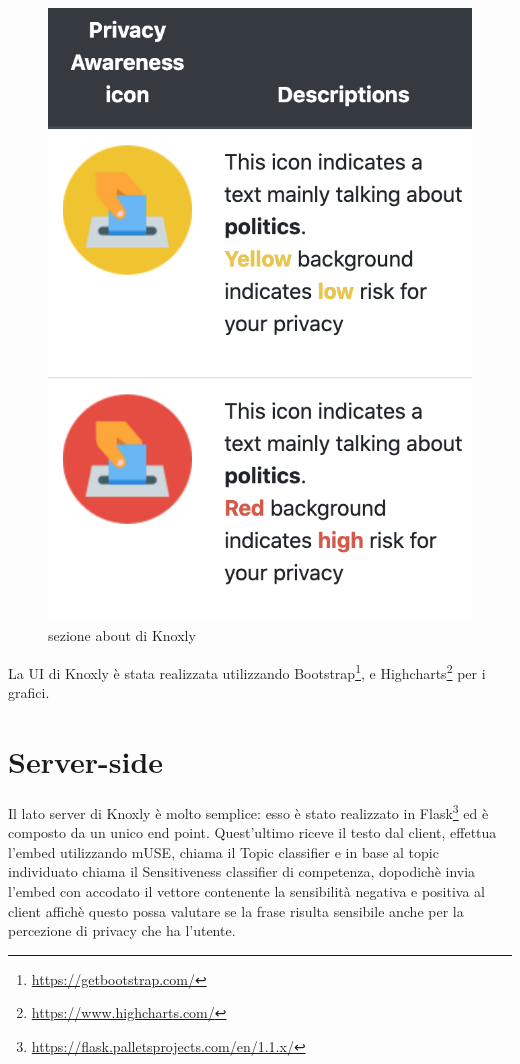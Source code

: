 \begin{figure}[h]
    \centering
    \includegraphics[scale=0.5]{Figure/ui/about-2.png}
    \caption{sezione about di Knoxly}
    \label{fig:about}
\end{figure}
\FloatBarrier

La UI di Knoxly è stata realizzata utilizzando Bootstrap\footnote{\url{https://getbootstrap.com/}}, e Highcharts\footnote{\url{https://www.highcharts.com/}} per i grafici.

\section{Server-side}
\label{sec:backend}
Il lato server di Knoxly è molto semplice: esso è stato realizzato in Flask\footnote{\url{https://flask.palletsprojects.com/en/1.1.x/}} ed è composto da un unico end point. Quest'ultimo riceve il testo dal client, effettua l'embed utilizzando mUSE, chiama il Topic classifier e in base al topic individuato chiama il Sensitiveness classifier di competenza, dopodichè invia l'embed con accodato il vettore contenente la sensibilità negativa e positiva al client affichè questo possa valutare se la frase risulta sensibile anche per la percezione di privacy che ha l'utente.